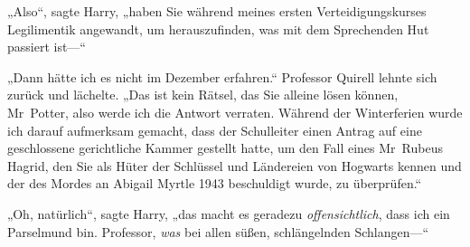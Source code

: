 „Also“, sagte Harry, „haben Sie während meines ersten Verteidigungskurses Legilimentik angewandt, um herauszufinden, was mit dem Sprechenden Hut passiert ist—“

„Dann hätte ich es nicht im Dezember erfahren.“ Professor Quirell lehnte sich zurück und lächelte. „Das ist kein Rätsel, das Sie alleine lösen können, Mr~Potter, also werde ich die Antwort verraten. Während der Winterferien wurde ich darauf aufmerksam gemacht, dass der Schulleiter einen Antrag auf eine geschlossene gerichtliche Kammer gestellt hatte, um den Fall eines Mr~Rubeus Hagrid, den Sie als Hüter der Schlüssel und Ländereien von Hogwarts kennen und der des Mordes an Abigail Myrtle 1943 beschuldigt wurde, zu überprüfen.“

„Oh, natürlich“, sagte Harry, „das macht es geradezu \emph{offensichtlich}, dass ich ein Parselmund bin. Professor, \emph{was} bei allen süßen, schlängelnden Schlangen—“


